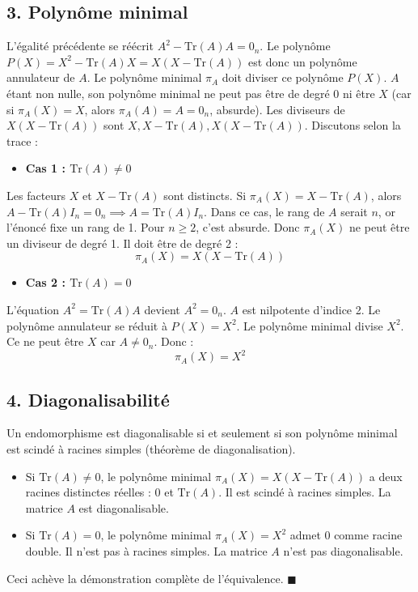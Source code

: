 \documentclass[11pt,a4paper]{article}
\begin{document}
\subsection{3. Polynôme minimal}
L'égalité précédente se réécrit $A^2 - \text{Tr}(A) A = 0_n$.
Le polynôme $P(X) = X^2 - \text{Tr}(A) X = X(X - \text{Tr}(A))$ est donc un polynôme annulateur de $A$.
Le polynôme minimal $\pi_A$ doit diviser ce polynôme $P(X)$.
$A$ étant non nulle, son polynôme minimal ne peut pas être de degré 0 ni être $X$ (car si $\pi_A(X) = X$, alors $\pi_A(A) = A = 0_n$, absurde).
Les diviseurs de $X(X - \text{Tr}(A))$ sont $X, X - \text{Tr}(A), X(X - \text{Tr}(A))$.
Discutons selon la trace :
\begin{itemize}
\item \textbf{Cas 1 : $\text{Tr}(A) \neq 0$}
\end{itemize}
Les facteurs $X$ et $X - \text{Tr}(A)$ sont distincts.
Si $\pi_A(X) = X - \text{Tr}(A)$, alors $A - \text{Tr}(A) I_n = 0_n \implies A = \text{Tr}(A) I_n$. Dans ce cas, le rang de $A$ serait $n$, or l'énoncé fixe un rang de 1. Pour $n \ge 2$, c'est absurde.
Donc $\pi_A(X)$ ne peut être un diviseur de degré 1. Il doit être de degré 2 :
$$\pi_A(X) = X(X - \text{Tr}(A))$$
\begin{itemize}
\item \textbf{Cas 2 : $\text{Tr}(A) = 0$}
\end{itemize}
L'équation $A^2 = \text{Tr}(A) A$ devient $A^2 = 0_n$. $A$ est nilpotente d'indice 2.
Le polynôme annulateur se réduit à $P(X) = X^2$.
Le polynôme minimal divise $X^2$. Ce ne peut être $X$ car $A \neq 0_n$. Donc :
$$\pi_A(X) = X^2$$

\subsection{4. Diagonalisabilité}
Un endomorphisme est diagonalisable si et seulement si son polynôme minimal est scindé à racines simples (théorème de diagonalisation).
\begin{itemize}
\item Si $\text{Tr}(A) \neq 0$, le polynôme minimal $\pi_A(X) = X(X - \text{Tr}(A))$ a deux racines distinctes réelles : $0$ et $\text{Tr}(A)$. Il est scindé à racines simples. La matrice $A$ est diagonalisable.
\item Si $\text{Tr}(A) = 0$, le polynôme minimal $\pi_A(X) = X^2$ admet 0 comme racine double. Il n'est pas à racines simples. La matrice $A$ n'est pas diagonalisable.
\end{itemize}
Ceci achève la démonstration complète de l'équivalence. $\blacksquare$
\end{document}
